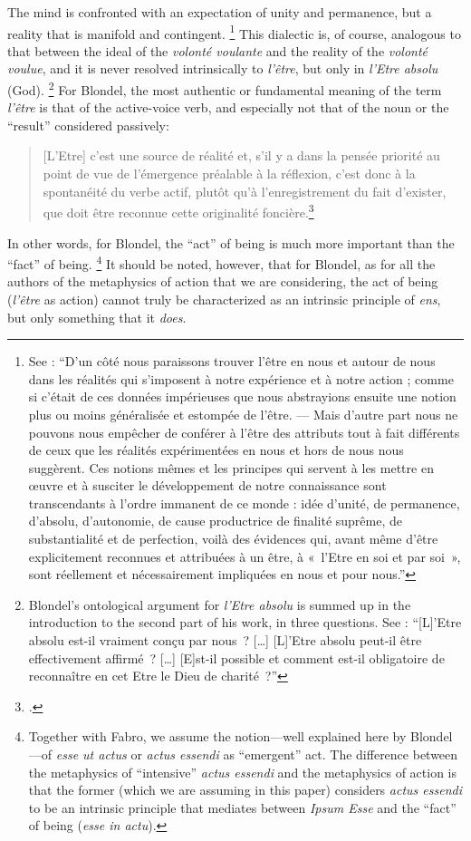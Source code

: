 %
The mind is confronted with an expectation of unity and permanence, but a reality that is manifold and contingent.%
%
\footnote{See \cite[67--68]{blondel:action}: ``D'un côté nous paraissons trouver l'être en nous et autour de nous dans les réalités qui s'imposent à notre expérience et à notre action ; comme si c'était de ces données impérieuses que nous abstrayions ensuite une notion plus ou moins généralisée et estompée de l'être. --- Mais d'autre part nous ne pouvons nous empêcher de conférer à l'être des attributs tout à fait différents de ceux que les réalités expérimentées en nous et hors de nous nous suggèrent. Ces notions mêmes et les principes qui servent à les mettre en œuvre et à susciter le développement de notre connaissance sont transcendants à l'ordre immanent de ce monde : idée d'unité, de permanence, d'absolu, d'autonomie, de cause productrice de finalité suprême, de substantialité et de perfection, voilà des évidences qui, avant même d'être explicitement reconnues et attribuées à un être, à «~l'Etre en soi et par soi~», sont réellement et nécessairement impliquées en nous et pour nous.''}
%
This dialectic is, of course, analogous to that between the ideal of the \emph{volonté voulante} and the reality of the \emph{volonté voulue}, and it is never resolved intrinsically to \emph{l'être}, but only in \emph{l'Etre absolu} (God).%
%
\footnote{Blondel's ontological argument for \emph{l'Etre absolu} is summed up in the introduction to the second part of his work, in three questions. See \cite[149]{blondel:action}: ``[L]'Etre absolu est-il vraiment conçu par nous~? [\ldots] [L]'Etre absolu peut-il être effectivement affirmé~? [\ldots] [E]st-il possible et comment est-il obligatoire de reconnaître en cet Etre le Dieu de charité~?''}
%
For Blondel, the most authentic or fundamental meaning of the term \emph{l'être} is that of the active-voice verb, and especially not that of the noun or the ``result'' considered passively:
%
\begin{quotation}
[L'Etre] c'est une source de réalité et, s'il y a dans la pensée priorité au point de vue de l'émergence préalable à la réflexion, c'est donc à la spontanéité du verbe actif, plutôt qu'à l'enregistrement du fait d'exister, que doit être reconnue cette originalité foncière.\footcite[48--49]{blondel:etre}
\end{quotation}
%
In other words, for Blondel, the ``act'' of being is much more important than the ``fact'' of being.%
%
\footnote{Together with Fabro, we assume the notion---well explained here by Blondel---of \emph{esse ut actus} or \emph{actus essendi} as ``emergent'' act. The difference between the metaphysics of ``intensive'' \emph{actus essendi} and the metaphysics of action is that the former (which we are assuming in this paper) considers \emph{actus essendi} to be an intrinsic principle that mediates between \emph{Ipsum Esse} and the ``fact'' of being (\emph{esse in actu}).}
%
It should be noted, however, that for Blondel, as for all the authors of the metaphysics of action that we are considering, the act of being (\emph{l'être} as action) cannot truly be characterized as an intrinsic principle of \emph{ens}, but only something that it \emph{does}.

